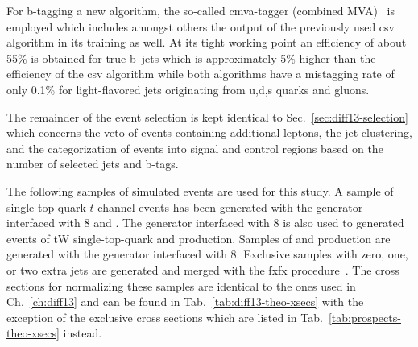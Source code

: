 For b-tagging a new algorithm, the so-called \gls{cmva}-tagger (combined MVA)~\cite{CMS-PAS-BTV-15-001} is employed which includes amongst others the output of the previously used \gls{csv} algorithm in its training as well. At its tight working point an efficiency of about 55\% is obtained for true b~jets which is approximately 5\% higher than the efficiency of the \gls{csv} algorithm while both algorithms have a mistagging rate of only 0.1\% for light-flavored jets originating from u,d,s quarks and gluons.

The remainder of the event selection is kept identical to Sec.~\ref{sec:diff13-selection} which concerns the veto of events containing additional leptons, the jet clustering, and the categorization of events into signal and control regions based on the number of selected jets and b-tags.

The following samples of simulated events are used for this study. A sample of single-top-quark $t$-channel events has been generated with the \POWHEG generator interfaced with \PYTHIA{}8 and \MADSPIN. The \POWHEG generator interfaced with \PYTHIA{}8 is also used to generated events of tW single-top-quark and \ttbar production. Samples of \wjets and \zjets production are generated with the \MGAMC generator interfaced with \PYTHIA{}8. Exclusive \wjets samples with zero, one, or two extra jets are generated and merged with the \gls{fxfx} procedure~\cite{Frederix:2012ps}. The cross sections for normalizing these samples are identical to the ones used in Ch.~\ref{ch:diff13} and can be found in Tab.~\ref{tab:diff13-theo-xsecs} with the exception of the exclusive \wjets cross sections which are listed in Tab.~\ref{tab:prospects-theo-xsecs} instead.



